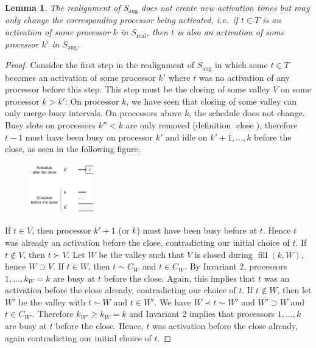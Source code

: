 \documentclass[a4paper]{article}
\DeclareMathOperator{\aug}{aug}
\DeclareMathOperator{\real}{real}
\DeclareMathOperator{\fillop}{fill}
\DeclareMathOperator{\close}{close}
\newtheorem{lemma}[theorem]{Lemma}
\begin{document}
\begin{lemma}\label{lemma:activations}
  The realignment of $S_{\aug}$ does not create new activation times but may only change the corresponding processor being activated, i.e.\ if $t \in T$ is an activation of some processor $k$ in $S_{\real}$, then $t$ is also an activation of some processor $k'$ in $S_{\aug}$.
\end{lemma}
\begin{proof}
  Consider the first step in the realignment of $S_{\aug}$ in which some $t \in T$ becomes an activation of some processor $k'$ where $t$ was no activation of any processor before this step.
  This step must be the closing of some valley $V$ on some processor $k > k'$:
  On processor $k$, we have seen that closing of some valley can only merge busy intervals.
  On processors above $k$, the schedule does not change.
  Busy slots on processors $k'' < k$ are only removed (definition $\close$), therefore $t-1$ must have been busy on processor $k'$ and idle on $k' + 1, \ldots, k$ before the close, as seen in the following figure.
  \begin{figure}[H]
    \centering
    \includegraphics[width=0.25\textwidth]{graphics/activations.jpg}
  \end{figure}
  If $t \in V$, then processor $k' + 1$ (or $k$) must have been busy before at $t$.
  Hence $t$ was already an activation before the close, contradicting our initial choice of $t$.
  If $t \notin V$, then $t \succ V$.
  Let $W$ be the valley such that $V$ is closed during $\fillop(k, W)$, hence $W \supset V$.
  If $t \in W$, then $t \sim C_W$ and $t \in C_W$.
  By Invariant 2, processors $1, \ldots, k_W = k$ are busy at $t$ before the close.
  Again, this implies that $t$ was an activation before the close already, contradicting our choice of $t$.
  If $t \notin W$, then let $W'$ be the valley with $t \sim W$ and $t \in W'$.
  We have $W \prec t \sim W'$ and $W' \supset W$ and $t \in C_{W'}$.
  Therefore $k_{W'} \geq k_W = k$ and Invariant 2 implies that processors $1, \ldots, k$ are busy at $t$ before the close.
  Hence, $t$ was activation before the close already, again contradicting our initial choice of $t$.
\end{proof}
\end{document}
